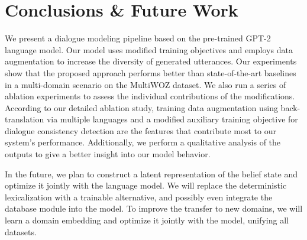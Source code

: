\documentclass[11pt,a4paper]{article}
\newcommand{\Augpt}[0]{Our model\xspace}
\begin{document}
\section{Conclusions \& Future Work}
We present a dialogue modeling pipeline based on the pre-trained GPT-2 language model.
\Augpt uses modified training objectives and employs data augmentation to increase the diversity of generated utterances.
Our experiments show that the proposed approach performs better than state-of-the-art baselines in a multi-domain scenario on the MultiWOZ dataset.
We also run a series of ablation experiments to assess the individual contributions of the modifications.
According to our detailed ablation study, 
training data augmentation using back-translation via multiple languages and a modified auxiliary training objective for dialogue consistency detection are the features that contribute most to our system's performance.
Additionally, we perform a qualitative analysis of the outputs to give a better insight into our model behavior.


In the future, we plan to construct a latent representation of the belief state and optimize it jointly with the language model. We will replace the deterministic lexicalization with a trainable alternative, and possibly even integrate the database module into the model. To improve the transfer to new domains, we will learn a domain embedding and optimize it jointly with the model, unifying all datasets.






\end{document}
